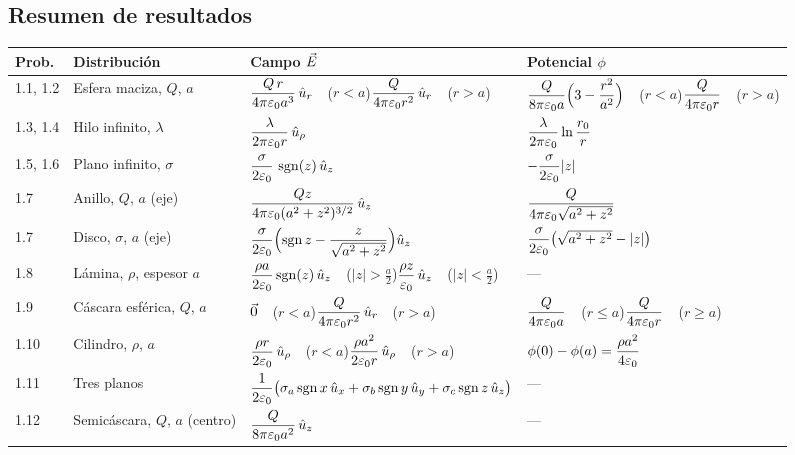 

\subsection{Resumen de resultados}\label{sec:resumen-seminarios}
\begin{center}
\label{tab:resultados}
\footnotesize
\renewcommand{\arraystretch}{2.3}
\begin{tabular}{@{}p{1.0cm}p{2.4cm}p{6.2cm}p{4.6cm}@{}}
\toprule
Prob. & Distribución & Campo $\vec{E}$ & Potencial $\phi$\\
\midrule
1.1, 1.2 & Esfera maciza, $Q$, $a$ &
  $\dfrac{Q\,r}{4\pi\varepsilon_{0} a^{3}}\,\hat{u}_{r}$\ \ ($r<a$)\newline $\dfrac{Q}{4\pi\varepsilon_{0} r^{2}}\,\hat{u}_{r}$\ \ ($r>a$) &
  $\dfrac{Q}{8\pi\varepsilon_{0} a}\Bigl(3-\dfrac{r^{2}}{a^{2}}\Bigr)$\ \ ($r<a$)\newline $\dfrac{Q}{4\pi\varepsilon_{0} r}$\ \ ($r>a$)\\
1.3, 1.4 & Hilo infinito, $\lambda$ & $\dfrac{\lambda}{2\pi\varepsilon_{0} r}\,\hat{u}_{\rho}$ & $\dfrac{\lambda}{2\pi\varepsilon_{0}}\ln\dfrac{r_0}{r}$\\
1.5, 1.6 & Plano infinito, $\sigma$ & $\dfrac{\sigma}{2\varepsilon_{0}}\,\operatorname{sgn}(z)\,\hat{u}_{z}$ & $-\dfrac{\sigma}{2\varepsilon_{0}}\lvert z\rvert$\\
1.7 & Anillo, $Q$, $a$ (eje) & $\dfrac{Qz}{4\pi\varepsilon_{0}(a^{2}+z^{2})^{3/2}}\,\hat{u}_{z}$ & $\dfrac{Q}{4\pi\varepsilon_{0}\sqrt{a^{2}+z^{2}}}$\\
1.7 & Disco, $\sigma$, $a$ (eje) & $\dfrac{\sigma}{2\varepsilon_{0}}\Bigl(\operatorname{sgn} z-\dfrac{z}{\sqrt{a^{2}+z^{2}}}\Bigr)\hat{u}_{z}$ & $\dfrac{\sigma}{2\varepsilon_{0}}\bigl(\sqrt{a^{2}+z^{2}}-\lvert z\rvert\bigr)$\\
1.8 & Lámina, $\rho$, espesor $a$ & $\dfrac{\rho a}{2\varepsilon_{0}}\operatorname{sgn}(z)\,\hat{u}_{z}$\ \ ($\lvert z\rvert>\tfrac a2$)\newline $\dfrac{\rho z}{\varepsilon_{0}}\,\hat{u}_{z}$\ \ ($\lvert z\rvert<\tfrac a2$) & ---\\
1.9 & Cáscara esférica, $Q$, $a$ & $\vec{0}$\ \ ($r<a$)\newline $\dfrac{Q}{4\pi\varepsilon_{0} r^{2}}\,\hat{u}_{r}$\ \ ($r>a$) & $\dfrac{Q}{4\pi\varepsilon_{0} a}$\ \ ($r\le a$)\newline $\dfrac{Q}{4\pi\varepsilon_{0} r}$\ \ ($r\ge a$)\\
1.10 & Cilindro, $\rho$, $a$ & $\dfrac{\rho r}{2\varepsilon_{0}}\,\hat{u}_{\rho}$\ \ ($r<a$)\newline $\dfrac{\rho a^{2}}{2\varepsilon_{0} r}\,\hat{u}_{\rho}$\ \ ($r>a$) & $\phi(0)-\phi(a)=\dfrac{\rho a^{2}}{4\varepsilon_{0}}$\\
1.11 & Tres planos & $\dfrac{1}{2\varepsilon_{0}}\bigl(\sigma_a\operatorname{sgn} x\,\hat{u}_{x}+\sigma_b\operatorname{sgn} y\,\hat{u}_{y}+\sigma_c\operatorname{sgn} z\,\hat{u}_{z}\bigr)$ & ---\\
1.12 & Semicáscara, $Q$, $a$ (centro) & $\dfrac{Q}{8\pi\varepsilon_{0} a^{2}}\,\hat{u}_{z}$ & ---\\
\bottomrule
\end{tabular}
\end{center}
